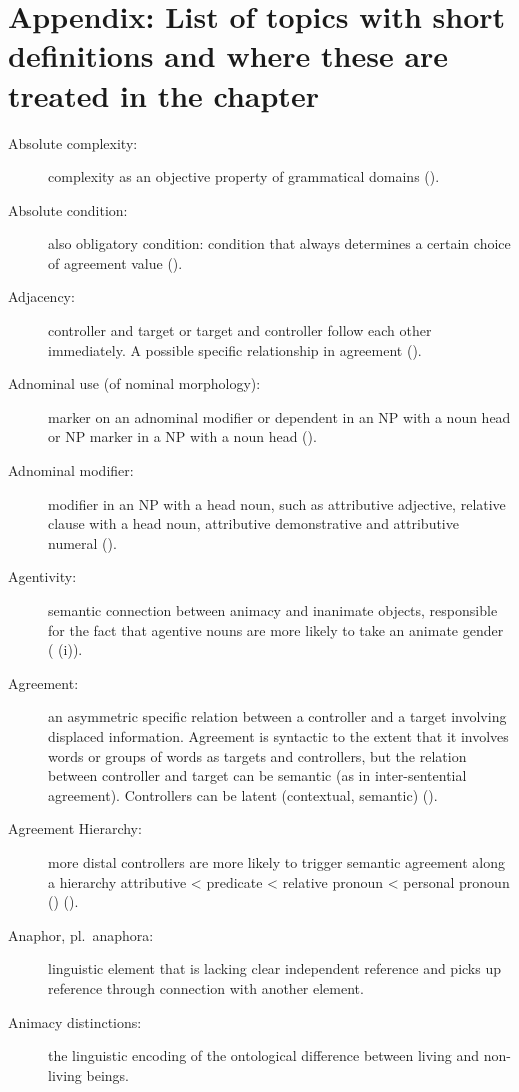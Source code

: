 \documentclass[output=collectionpaper]{langsci/langscibook}
\begin{document}
\section*{Appendix: List of topics with short definitions and where these are treated in the chapter}
\label{WDG:appendix}
{\sloppy%
\begin{description}
\item [Absolute complexity:] complexity as an objective property of grammatical domains ().
\item [Absolute condition:] also obligatory condition: condition that always determines a certain choice of agreement value ().
\item  [Adjacency:] controller and target or target and controller follow each other immediately. A possible specific relationship in agreement ().
\largerpage
\item  [Adnominal use (of nominal morphology):] marker on an adnominal modifier or dependent in an NP with a noun head or NP marker in a NP with a noun head ().
\item  [Adnominal modifier:] modifier in an NP with a head noun, such as attributive adjective, relative clause with a head noun, attributive demonstrative and attributive numeral ().
\item  [Agentivity:] semantic connection between animacy and inanimate objects, responsible for the fact that agentive nouns are more likely to take an animate gender ( (i)).
\item  [Agreement:] an asymmetric specific relation between a controller and a target involving displaced information. Agreement is syntactic to the extent that it involves words or groups of words as targets and controllers, but the relation between controller and target can be semantic (as in inter-sentential agreement). Controllers can be latent (contextual, semantic) ().
%
\item  [Agreement Hierarchy:] more distal controllers are more likely to trigger semantic agreement along a hierarchy attributive < predicate < relative pronoun < personal pronoun (\citealt[226]{Corbett1991}) ().
\item  [Anaphor, {\normalfont pl.}\ anaphora:] linguistic element that is lacking clear independent reference and picks up reference through connection with another element.
\item  [Animacy distinctions:] the linguistic encoding of the ontological difference between living and non-living beings.

\end{description}}
\end{document}
